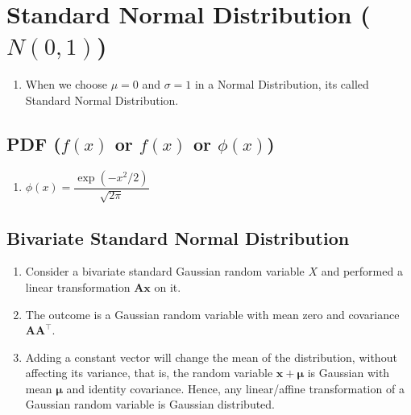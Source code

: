 \section{Standard Normal Distribution (${N}(0, 1)$)}

\begin{enumerate}
    \item When we choose $\mu = 0$ and $\sigma = 1$ in a Normal Distribution, its called Standard Normal Distribution.
    \hfill \cite{statistics/book/Statistics-for-Data-Scientists/Maurits-Kaptein}


\end{enumerate}


\subsection{PDF ($f(x)$ or $f(x)$ or $\phi(x)$)}

\begin{enumerate}
    \item[] $\phi(x) = \dfrac{\exp(-x^2/2)}{\sqrt{2\pi}}$
    \hfill {}


\end{enumerate}



\subsection{Bivariate Standard Normal Distribution}

\begin{enumerate}
    \item Consider a bivariate standard Gaussian random variable $X$ and performed a linear transformation $\bm{Ax}$ on it. 
    \hfill \cite{mfml/book/mml/Deisenroth-Faisal-Ong}

    \item The outcome is a Gaussian random variable with mean zero and covariance $\bm{AA}^\top$.
    \hfill \cite{mfml/book/mml/Deisenroth-Faisal-Ong}

    \item Adding a constant vector will change the mean of the distribution, without affecting its variance, that is, the random variable $\bm{x} + \bm{\mu}$ is Gaussian with mean $\bm{\mu}$ and identity covariance.
    Hence, any linear/affine transformation of a Gaussian random variable is Gaussian distributed.
    \hfill \cite{mfml/book/mml/Deisenroth-Faisal-Ong}

\end{enumerate}













